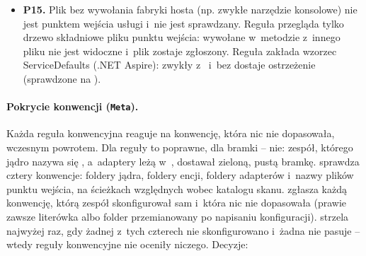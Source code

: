 \begin{itemize}[leftmargin=*]
        dopasowanie tylko pierwszego segmentu sprawiało, że wpis wielosegmentowy
         nigdy niczego nie łapał; zastąpiono je dopasowaniem na
        granicy segmentu ( łapie , nie łapie
        ).
  \item \textbf{P15.} Plik bez wywołania fabryki hosta (np. zwykłe narzędzie konsolowe)
        nie jest punktem wejścia usługi i~nie jest sprawdzany. Reguła przegląda tylko
        drzewo składniowe pliku punktu wejścia:  wywołane
        w~metodzie z~innego pliku nie jest widoczne i~plik zostaje zgłoszony. Reguła zakłada
        wzorzec ServiceDefaults (.NET Aspire): zwykły  z~
        i~bez  dostaje ostrzeżenie (sprawdzone na ).
\end{itemize}

\paragraph{Pokrycie konwencji (\texttt{Meta}).} Każda reguła konwencyjna reaguje na
konwencję, która nic nie dopasowała, wczesnym powrotem. Dla reguły to poprawne, dla bramki --
nie: zespół, którego jądro nazywa się , a~adaptery leżą w~,
dostawał zieloną, pustą bramkę.  sprawdza cztery
konwencje: foldery jądra, foldery encji, foldery adapterów i~nazwy plików punktu wejścia,
na ścieżkach względnych wobec katalogu skanu. 
zgłasza każdą konwencję, którą zespół skonfigurował sam i~która nic nie dopasowała (prawie
zawsze literówka albo folder przemianowany po napisaniu konfiguracji).
 strzela najwyżej raz, gdy żadnej z~tych
czterech nie skonfigurowano i~żadna nie pasuje -- wtedy reguły konwencyjne nie oceniły
niczego. Decyzje:

